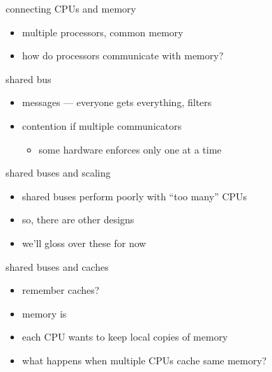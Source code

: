 \usetikzlibrary{arrows.meta,matrix}

\begin{frame}{connecting CPUs and memory}
    \begin{itemize}
    \item multiple processors, common memory
    \item how do processors communicate with memory?
    \end{itemize}
\end{frame}

\begin{frame}{shared bus}
\begin{itemize}
\item {} messages --- everyone gets everything, filters
\item contention if multiple communicators
    \begin{itemize}
    \item some hardware enforces only one at a time
    \end{itemize}
\end{itemize}
\end{frame}

\begin{frame}{shared buses and scaling}
    \begin{itemize}
    \item shared buses perform poorly with ``too many'' CPUs
    \item so, there are other designs
        \vspace{.5cm}
    \item we'll gloss over these for now
    \end{itemize}
\end{frame}

\begin{frame}{shared buses and caches}
    \begin{itemize}
    \item remember caches?
    \item memory is 
    \item each CPU wants to keep local copies of memory
        \vspace{.5cm}
    \item what happens when multiple CPUs cache same memory?
    \end{itemize}
\end{frame}
